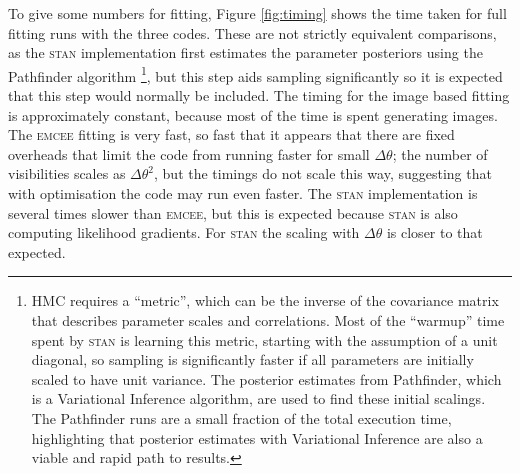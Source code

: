 \documentclass[fleqn,usenatbib]{mnras}
\begin{document}
To give some numbers for fitting, Figure \ref{fig:timing} shows the time taken for full fitting runs with the three codes. These are not strictly equivalent comparisons, as the \textsc{stan} implementation first estimates the parameter posteriors using the Pathfinder algorithm \citep{JMLR:v23:21-0889}\footnote{HMC requires a ``metric'', which can be the inverse of the covariance matrix that describes parameter scales and correlations. Most of the ``warmup'' time spent by \textsc{stan} is learning this metric, starting with the assumption of a unit diagonal, so sampling is significantly faster if all parameters are initially scaled to have unit variance. The posterior estimates from Pathfinder, which is a Variational Inference algorithm, are used to find these initial scalings. The Pathfinder runs are a small fraction of the total execution time, highlighting that posterior estimates with Variational Inference are also a viable and rapid path to results.}, but this step aids sampling significantly so it is expected that this step would normally be included. The timing for the image based fitting is approximately constant, because most of the time is spent generating images. The \textsc{emcee} fitting is very fast, so fast that it appears that there are fixed overheads that limit the code from running faster for small $\Delta \theta$; the number of visibilities scales as $\Delta \theta^2$, but the timings do not scale this way, suggesting that with optimisation the code may run even faster. The \textsc{stan} implementation is several times slower than \textsc{emcee}, but this is expected because \textsc{stan} is also computing likelihood gradients. For \textsc{stan} the scaling with $\Delta \theta$ is closer to that expected.

\end{document}
